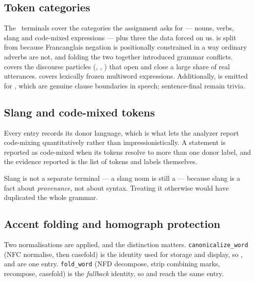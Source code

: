 \subsection{Token categories}

\begin{center}\end{center}

The \TerminalCount\ terminals cover the categories the assignment asks for --- nouns, verbs,
slang and code-mixed expressions --- plus three the data forced on us.  is split
from  because Francanglais negation is positionally constrained in a way ordinary
adverbs are not, and folding the two together introduced grammar conflicts. 
covers the discourse particles (, , ) that open and close a large
share of real utterances.  covers lexically frozen multiword expressions.
Additionally,  is emitted for \term{,} \term{;} \term{:}, which are genuine clause
boundaries in speech; sentence-final  remain trivia.

\subsection{Slang and code-mixed tokens}

Every entry records its donor language, which is what lets the analyzer report code-mixing
quantitatively rather than impressionistically. A statement is reported as code-mixed when
its tokens resolve to more than one donor label, and the evidence reported is the list of
tokens and labels themselves.

\begin{center}\end{center}

Slang is not a separate terminal --- a slang noun is still a  --- because slang is a
fact about \emph{provenance}, not about syntax. Treating it otherwise would have duplicated
the whole grammar.

\subsection{Accent folding and homograph protection}

Two normalisations are applied, and the distinction matters.
\texttt{canonicalize\_word} (NFC normalise, then casefold) is the identity used for storage
and display, so ,  and  are one entry.
\texttt{fold\_word} (NFD decompose, strip combining marks, recompose, casefold) is the
\emph{fallback} identity, so  and  reach the same entry.

